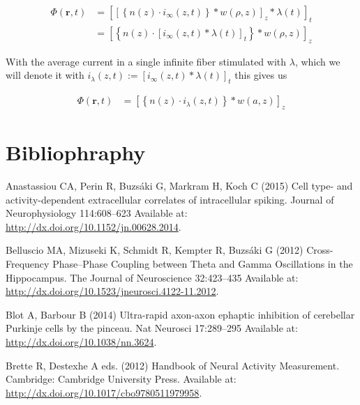 \documentclass[]{article}
\begin{document}
\begin{align}
  \label{eqn:switchedpot}
  \Phi(\mathbf{r},t) & =  \left[\left[\left\{n(z)\cdot i_{\infty}(z,t)\right\}\ast w(\rho,z)\right]_z \ast \lambda(t)\right]_t \\
  & =  \left[\left\{n(z)\cdot \left[i_{\infty}(z,t)\ast \lambda(t)\right]_t\right\}\ast w(\rho,z)\right]_z
\end{align}

With the average current in a single infinite fiber stimulated with
\(\lambda\), which we will denote it with
\(i_\lambda(z,t) := \left[i_{\infty}(z,t)\ast \lambda(t)\right]_t\) this
gives us

\begin{align}
  \Phi(\mathbf{r},t) & =  \left[\left\{n(z)\cdot i_\lambda(z,t)\right\}\ast w(a,z)\right]_z
  \label{eqn:switchedpotend}
\end{align}

\section*{Bibliophraphy}\label{bibliophraphy}

Anastassiou CA, Perin R, Buzsáki G, Markram H, Koch C (2015) Cell type-
and activity-dependent extracellular correlates of intracellular
spiking. Journal of Neurophysiology 114:608--623 Available at:
\url{http://dx.doi.org/10.1152/jn.00628.2014}.

Belluscio MA, Mizuseki K, Schmidt R, Kempter R, Buzsáki G (2012)
Cross-Frequency Phase--Phase Coupling between Theta and Gamma
Oscillations in the Hippocampus. The Journal of Neuroscience 32:423--435
Available at: \url{http://dx.doi.org/10.1523/jneurosci.4122-11.2012}.

Blot A, Barbour B (2014) Ultra-rapid axon-axon ephaptic inhibition of
cerebellar Purkinje cells by the pinceau. Nat Neurosci 17:289--295
Available at: \url{http://dx.doi.org/10.1038/nn.3624}.

Brette R, Destexhe A eds. (2012) Handbook of Neural Activity
Measurement. Cambridge: Cambridge University Press. Available at:
\url{http://dx.doi.org/10.1017/cbo9780511979958}.
\end{document}
